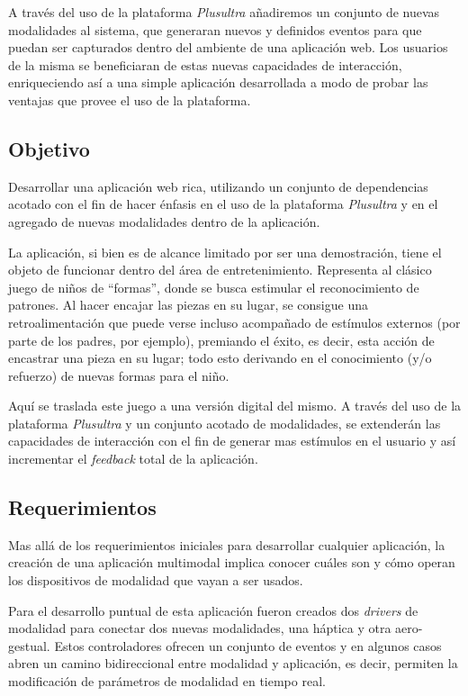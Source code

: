 A través del uso de la plataforma \emph{Plusultra} añadiremos un conjunto de nuevas modalidades al sistema, que generaran nuevos y definidos eventos para que puedan ser capturados dentro del ambiente de una aplicación web. Los usuarios de la misma se beneficiaran de estas nuevas capacidades de interacción, enriqueciendo así a una simple aplicación desarrollada a modo de probar las ventajas que provee el uso de la plataforma.

\subsection{Objetivo}
Desarrollar una aplicación web rica, utilizando un conjunto de dependencias acotado con el fin de hacer énfasis en el uso de la plataforma \emph{Plusultra} y en el agregado de nuevas modalidades dentro de la aplicación.

La aplicación, si bien es de alcance limitado por ser una demostración, tiene el objeto de funcionar dentro del área de entretenimiento. Representa al clásico juego de niños de ``formas'', donde se busca estimular el reconocimiento de patrones. Al hacer encajar las piezas en su lugar, se consigue una retroalimentación que puede verse incluso acompañado de estímulos externos (por parte de los padres, por ejemplo), premiando el éxito, es decir, esta acción de encastrar una pieza en su lugar; todo esto derivando en el conocimiento (y/o refuerzo) de nuevas formas para el niño.

Aquí se traslada este juego a una versión digital del mismo. A través del uso de la plataforma \emph{Plusultra} y un conjunto acotado de modalidades, se extenderán las capacidades de interacción con el fin de generar mas estímulos en el usuario y así incrementar el \emph{feedback} total de la aplicación. 

\subsection{Requerimientos}
Mas allá de los requerimientos iniciales para desarrollar cualquier aplicación, la creación de una aplicación multimodal implica conocer cuáles son y cómo operan los dispositivos de modalidad que vayan a ser usados. 

Para el desarrollo puntual de esta aplicación fueron creados dos \emph{drivers} de modalidad para conectar dos nuevas modalidades, una háptica y otra aero-gestual. 
Estos controladores ofrecen un conjunto de eventos y en algunos casos abren un camino bidireccional entre modalidad y aplicación, es decir, permiten la modificación de parámetros de modalidad en tiempo real. 


